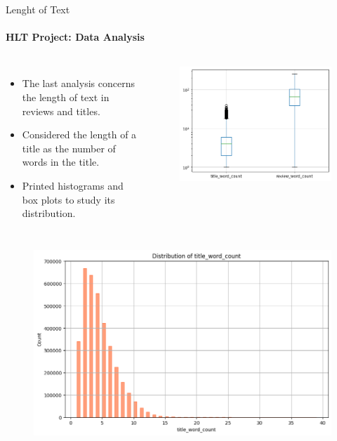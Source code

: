 \documentclass{beamer}
\theoremstyle{definition}
\theoremstyle{plain}
\begin{document}
\begin{frame}{Lenght of Text}
\framesubtitle{HLT Project: Data Analysis}
{\small 

\vspace{-0.3cm}
\begin{columns}
\begin{itemize}
    \item The last analysis concerns the length of text in reviews and titles.
    \item Considered the length of a title as the number of words in the title.
    \item Printed histograms and box plots to study its distribution.
\end{itemize}

\begin{figure}
    \centering
    \includegraphics[scale=0.3]{Figures/boxplot2.png}
\end{figure}
\end{columns}

\vspace{-0.4cm}
\begin{columns}
    \begin{figure}
        \centering
        \includegraphics[scale=0.23]{Figures/distribution1.1.png}
    \end{figure}


\end{columns}}
\end{frame}
\end{document}
